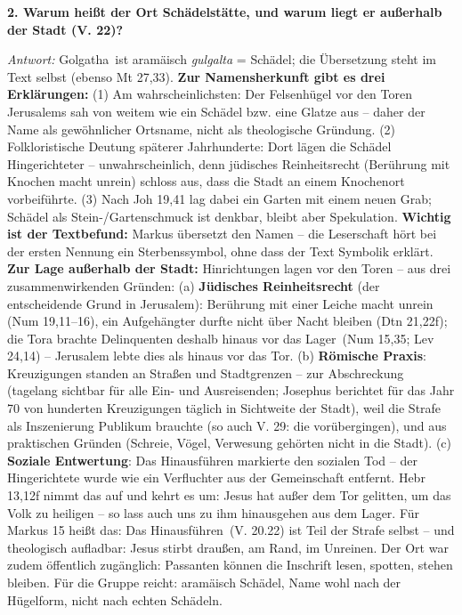 \documentclass[12pt,a4paper]{article}
\newcommand{\frage}[1]{\par\vspace{0.7em}\noindent\textbf{#1}\par}
\newcommand{\antwort}[1]{\par\noindent\textit{Antwort:} #1\par}
\begin{document}
\frage{2. Warum heißt der Ort \glqq Schädelstätte\grqq{}, und warum liegt er außerhalb der Stadt (V. 22)?}
\antwort{\glqq Golgatha\grqq\ ist aramäisch \emph{gulgalta} = Schädel; die Übersetzung steht im Text selbst (ebenso Mt 27,33). \textbf{Zur Namensherkunft gibt es drei Erklärungen:} (1) Am wahrscheinlichsten: Der Felsenhügel vor den Toren Jerusalems sah von weitem wie ein Schädel bzw. eine Glatze aus -- daher der Name als gewöhnlicher Ortsname, nicht als theologische Gründung. (2) Folkloristische Deutung späterer Jahrhunderte: Dort lägen die Schädel Hingerichteter -- unwahrscheinlich, denn jüdisches Reinheitsrecht (Berührung mit Knochen macht unrein) schloss aus, dass die Stadt an einem Knochenort vorbeiführte. (3) Nach Joh 19,41 lag dabei ein Garten mit einem neuen Grab; Schädel als Stein-/Gartenschmuck ist denkbar, bleibt aber Spekulation. \textbf{Wichtig ist der Textbefund:} Markus übersetzt den Namen -- die Leserschaft hört bei der ersten Nennung ein Sterbenssymbol, ohne dass der Text Symbolik erklärt. \textbf{Zur Lage außerhalb der Stadt:} Hinrichtungen lagen vor den Toren -- aus drei zusammenwirkenden Gründen: (a) \textbf{Jüdisches Reinheitsrecht} (der entscheidende Grund in Jerusalem): Berührung mit einer Leiche macht unrein (Num 19,11--16), ein Aufgehängter durfte nicht über Nacht bleiben (Dtn 21,22f); die Tora brachte Delinquenten deshalb \glqq hinaus vor das Lager\grqq\  (Num 15,35; Lev 24,14) -- Jerusalem lebte dies als \glqq hinaus vor das Tor\grqq{}. (b) \textbf{Römische Praxis}: Kreuzigungen standen an Straßen und Stadtgrenzen -- zur Abschreckung (tagelang sichtbar für alle Ein- und Ausreisenden; Josephus berichtet für das Jahr 70 von hunderten Kreuzigungen täglich in Sichtweite der Stadt), weil die Strafe als Inszenierung Publikum brauchte (so auch V. 29: \glqq die vorübergingen\grqq{}), und aus praktischen Gründen (Schreie, Vögel, Verwesung gehörten nicht in die Stadt). (c) \textbf{Soziale Entwertung}: Das Hinausführen markierte den sozialen Tod -- der Hingerichtete wurde wie ein Verfluchter aus der Gemeinschaft entfernt. Hebr 13,12f nimmt das auf und kehrt es um: \glqq Jesus hat außer dem Tor gelitten, um das Volk zu heiligen -- so lass auch uns zu ihm hinausgehen aus dem Lager\grqq{}. Für Markus 15 heißt das: Das \glqq Hinausführen\grqq\  (V. 20.22) ist Teil der Strafe selbst -- und theologisch aufladbar: Jesus stirbt draußen, am Rand, im Unreinen. Der Ort war zudem öffentlich zugänglich: Passanten können die Inschrift lesen, spotten, stehen bleiben. Für die Gruppe reicht: aramäisch \glqq Schädel\grqq{}, Name wohl nach der Hügelform, nicht nach echten Schädeln.}
\end{document}
